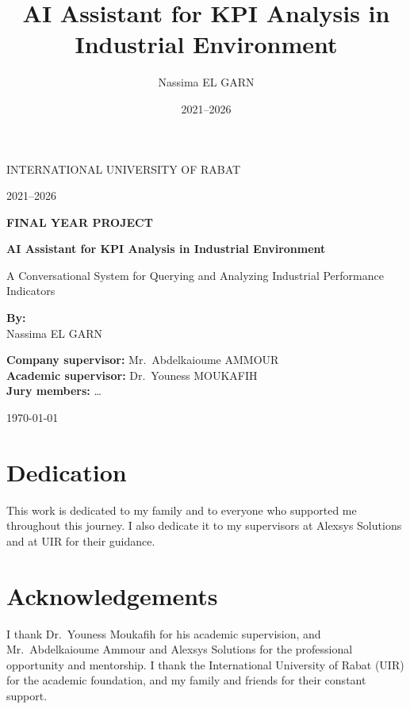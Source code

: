 \documentclass[12pt,a4paper,openany]{report}
\title{AI Assistant for KPI Analysis in Industrial Environment}
\author{Nassima EL GARN}
\date{2021--2026}
\begin{document}

\begin{titlepage}
\centering
\vspace*{1.5cm}
{\Large INTERNATIONAL UNIVERSITY OF RABAT\par}
\vspace{0.5cm}
{\large 2021--2026\par}
\vspace{2cm}
{\LARGE\bfseries FINAL YEAR PROJECT\par}
\vspace{1.5cm}
{\Large\bfseries AI Assistant for KPI Analysis in Industrial Environment\par}
\vspace{0.6cm}
{\large A Conversational System for Querying and Analyzing Industrial Performance Indicators\par}
\vfill
{\large\textbf{By:}\\[0.3cm]
Nassima EL GARN\par}
\vspace{1.2cm}
\begin{minipage}{0.9\textwidth}
\centering
\textbf{Company supervisor:} Mr.\ Abdelkaioume AMMOUR\\[0.4cm]
\textbf{Academic supervisor:} Dr.\ Youness MOUKAFIH\\[0.4cm]
\textbf{Jury members:} \ldots
\end{minipage}
\vfill
{\large \today\par}
\end{titlepage}

\chapter*{Dedication}
This work is dedicated to my family and to everyone who supported me throughout this journey. I also dedicate it to my supervisors at Alexsys Solutions and at UIR for their guidance.

\chapter*{Acknowledgements}
I thank Dr.\ Youness Moukafih for his academic supervision, and Mr.\ Abdelkaioume Ammour and Alexsys Solutions for the professional opportunity and mentorship. I thank the International University of Rabat (UIR) for the academic foundation, and my family and friends for their constant support.
\end{document}
